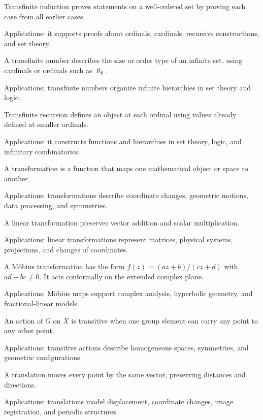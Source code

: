 Transfinite induction proves statements on a well-ordered set by proving each case from all earlier cases. \par\noindent Applications: it supports proofs about ordinals, cardinals, recursive constructions, and set theory.

A transfinite number describes the size or order type of an infinite set, using cardinals or ordinals such as $\aleph_0$. \par\noindent Applications: transfinite numbers organize infinite hierarchies in set theory and logic.

Transfinite recursion defines an object at each ordinal using values already defined at smaller ordinals. \par\noindent Applications: it constructs functions and hierarchies in set theory, logic, and infinitary combinatorics.

A transformation is a function that maps one mathematical object or space to another. \par\noindent Applications: transformations describe coordinate changes, geometric motions, data processing, and symmetries.

A linear transformation preserves vector addition and scalar multiplication. \par\noindent Applications: linear transformations represent matrices, physical systems, projections, and changes of coordinates.

A Möbius transformation has the form $f(z)=(az+b)/(cz+d)$ with $ad-bc\ne0$. It acts conformally on the extended complex plane. \par\noindent Applications: Möbius maps support complex analysis, hyperbolic geometry, and fractional-linear models.

An action of $G$ on $X$ is transitive when one group element can carry any point to any other point. \par\noindent Applications: transitive actions describe homogeneous spaces, symmetries, and geometric configurations.

A translation moves every point by the same vector, preserving distances and directions. \par\noindent Applications: translations model displacement, coordinate changes, image registration, and periodic structures.

